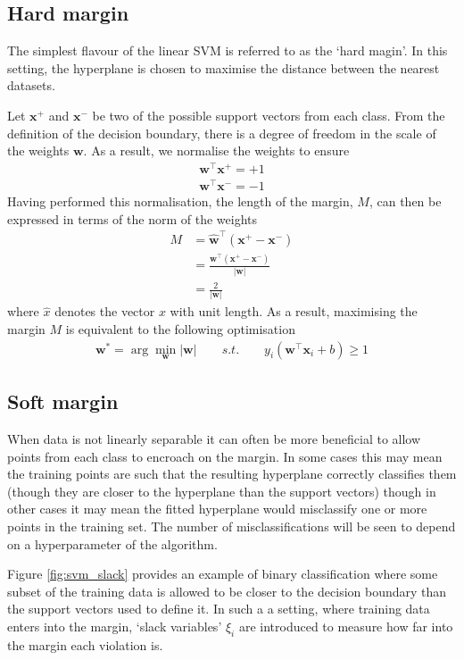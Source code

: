 \subsection{Hard margin}
The simplest flavour of the linear SVM is referred to as the `hard magin'. In this setting, the hyperplane is chosen to maximise the distance between the nearest datasets.

Let $\mathbf{x}^+$ and $\mathbf{x}^-$ be two of the possible support vectors from each class. From the definition of the decision boundary, there is a degree of freedom in the scale of the weights $\mathbf{w}$. As a result, we normalise the weights to ensure 
\begin{align}
\mathbf{w}^\top\mathbf{x}^+=+1\\
\mathbf{w}^\top\mathbf{x}^-=-1
\end{align}
Having performed this normalisation, the length of the margin, $M$, can then be expressed in terms of the norm of the weights
\begin{align}
M &=\hat{\mathbf{w}}^\top(\mathbf{x}^+-\mathbf{x}^-)\\
&=\frac{\mathbf{w}^\top(\mathbf{x}^+-\mathbf{x}^-)}{|\mathbf{w}|}\\
&=\frac{2}{|\mathbf{w}|}
\end{align}
where $\hat{x}$ denotes the vector $x$ with unit length. As a result, maximising the margin $M$ is equivalent to the following optimisation
\begin{align}
\mathbf{w}^*=\arg\min_\mathbf{w} |\mathbf{w}|\qquad s.t. \qquad y_i(\mathbf{w}^\top\mathbf{x}_i+b)\ge1
\end{align}


\subsection{Soft margin}
When data is not linearly separable it can often be more beneficial to allow points from each class to encroach on the margin. In some cases this may mean the training points are such that the resulting hyperplane correctly classifies them (though they are closer to the hyperplane than the support vectors) though in other cases it may mean the fitted hyperplane would misclassify one or more points in the training set. The number of misclassifications will be seen to depend on a hyperparameter of the algorithm.

Figure \ref{fig:svm_slack} provides an example of binary classification where some subset of the training data is allowed to be closer to the decision boundary than the support vectors used to define it. In such a a setting, where training data enters into the margin, `slack variables' $\xi_i$ are introduced to measure how far into the margin each violation is. 

